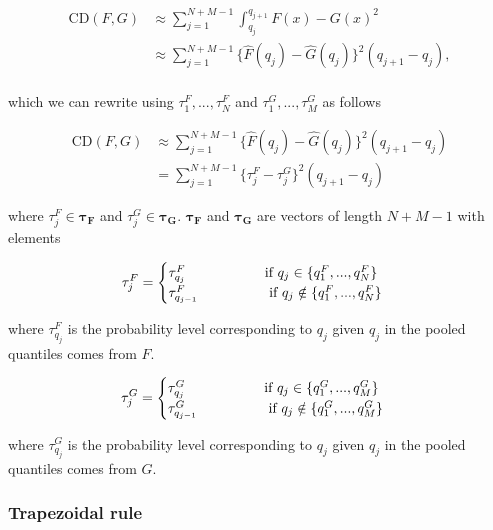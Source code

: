 \documentclass[
]{article}
\begin{document}
\begin{align}
\text{CD}(F,G) &\approx\sum^{N+M-1}_{j=1}\int^{q_{j+1}}_{q_j}{F(x)−G(x)}^2\\
&\approx\sum^{N+M-1}_{j=1}\{\hat{F}(q_j)-\hat{G}(q_j)\}^2(q_{j+1}-q_{j}),\\
\end{align}

which we can rewrite using \(\tau_1^F,...,\tau_N^F\) and
\(\tau_1^G,...,\tau_M^G\) as follows

\begin{align}
\text{CD}(F,G) 
&\approx\sum^{N+M-1}_{j=1}\{\hat{F}(q_j)-\hat{G}(q_j)\}^2(q_{j+1}-q_{j})\\
&=\sum^{N+M-1}_{j=1}\{\tau^F_j-\tau^G_j\}^2(q_{j+1}-q_{j})
\end{align}

where \(\tau^F_j \in \boldsymbol{\tau_F}\) and
\(\tau^G_j \in \boldsymbol{\tau_G}\). \(\boldsymbol{\tau_F}\) and
\(\boldsymbol{\tau_G}\) are vectors of length \(N+M-1\) with elements

\[
\tau^F_j=
\begin{cases}
\tau_{q_j}^F\hspace{2cm}\text{if }q_j\in \{q_1^F, ..., q_{N}^F\}\\
\tau_{q_{j-1}}^F\hspace{1.8cm}\text{if }q_j\notin \{q_1^F, ..., q_{N}^F\}\\
\end{cases}
\]

where \(\tau_{q_j}^F\) is the probability level corresponding to \(q_j\)
given \(q_j\) in the pooled quantiles comes from \(F\).

\[
\tau^G_j=
\begin{cases}
\tau_{q_j}^G\hspace{2cm}\text{if }q_j\in \{q_1^G, ..., q_{M}^G\}\\
\tau_{q_{j-1}}^G\hspace{1.8cm}\text{if }q_j\notin \{q_1^G, ..., q_{M}^G\}\\
\end{cases}
\]

where \(\tau_{q_j}^G\) is the probability level corresponding to \(q_j\)
given \(q_j\) in the pooled quantiles comes from \(G\).

\hypertarget{trapezoidal-rule-1}{%
\subsubsection{Trapezoidal rule}\label{trapezoidal-rule-1}}
\end{document}
